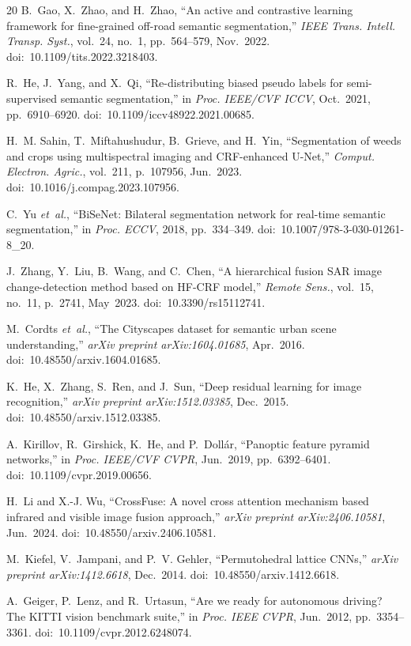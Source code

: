 \documentclass[conference]{IEEEtran}
\begin{document}
\begin{thebibliography}{20}
B.~Gao, X.~Zhao, and H.~Zhao,
``An active and contrastive learning framework for fine-grained off-road semantic segmentation,''
\emph{IEEE Trans. Intell. Transp. Syst.}, vol.~24, no.~1, pp.~564--579, Nov.~2022.
doi:~10.1109/tits.2022.3218403.

R.~He, J.~Yang, and X.~Qi,
``Re-distributing biased pseudo labels for semi-supervised semantic segmentation,''
in \emph{Proc. IEEE/CVF ICCV}, Oct.~2021, pp.~6910--6920.
doi:~10.1109/iccv48922.2021.00685.

H.~M. Sahin, T.~Miftahushudur, B.~Grieve, and H.~Yin,
``Segmentation of weeds and crops using multispectral imaging and CRF-enhanced U-Net,''
\emph{Comput. Electron. Agric.}, vol.~211, p.~107956, Jun.~2023.
doi:~10.1016/j.compag.2023.107956.

C.~Yu \emph{et~al.},
``BiSeNet: Bilateral segmentation network for real-time semantic segmentation,''
in \emph{Proc. ECCV}, 2018, pp.~334--349.
doi:~10.1007/978-3-030-01261-8\_20.

J.~Zhang, Y.~Liu, B.~Wang, and C.~Chen,
``A hierarchical fusion SAR image change-detection method based on HF-CRF model,''
\emph{Remote Sens.}, vol.~15, no.~11, p.~2741, May~2023.
doi:~10.3390/rs15112741.

M.~Cordts \emph{et~al.},
``The Cityscapes dataset for semantic urban scene understanding,''
\emph{arXiv preprint arXiv:1604.01685}, Apr.~2016.
doi:~10.48550/arxiv.1604.01685.

K.~He, X.~Zhang, S.~Ren, and J.~Sun,
``Deep residual learning for image recognition,''
\emph{arXiv preprint arXiv:1512.03385}, Dec.~2015.
doi:~10.48550/arxiv.1512.03385.

A.~Kirillov, R.~Girshick, K.~He, and P.~Dollár,
``Panoptic feature pyramid networks,''
in \emph{Proc. IEEE/CVF CVPR}, Jun.~2019, pp.~6392--6401.
doi:~10.1109/cvpr.2019.00656.

H.~Li and X.-J. Wu,
``CrossFuse: A novel cross attention mechanism based infrared and visible image fusion approach,''
\emph{arXiv preprint arXiv:2406.10581}, Jun.~2024.
doi:~10.48550/arxiv.2406.10581.

M.~Kiefel, V.~Jampani, and P.~V. Gehler,
``Permutohedral lattice CNNs,''
\emph{arXiv preprint arXiv:1412.6618}, Dec.~2014.
doi:~10.48550/arxiv.1412.6618.

A.~Geiger, P.~Lenz, and R.~Urtasun,
``Are we ready for autonomous driving? The KITTI vision benchmark suite,''
in \emph{Proc. IEEE CVPR}, Jun.~2012, pp.~3354--3361.
doi:~10.1109/cvpr.2012.6248074.

\end{thebibliography}
\end{document}
